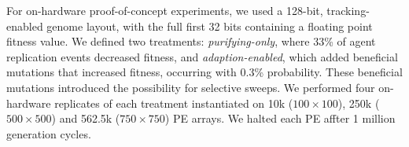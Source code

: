 

% 





For on-hardware proof-of-concept experiments, we used a 128-bit, tracking-enabled genome layout, with the full first 32 bits containing a floating point fitness value.
We defined two treatments: \textit{purifying-only}, where 33\% of agent replication events decreased fitness,  and \textit{adaption-enabled}, which added beneficial mutations that increased fitness, occurring with 0.3\% probability.
These beneficial mutations introduced the possibility for selective sweeps.
We performed four on-hardware replicates of each treatment instantiated on 10k ($100\times100$), 250k ($500\times500$) and 562.5k ($750\times750$) PE arrays.
We halted each PE affter 1 million generation cycles.

